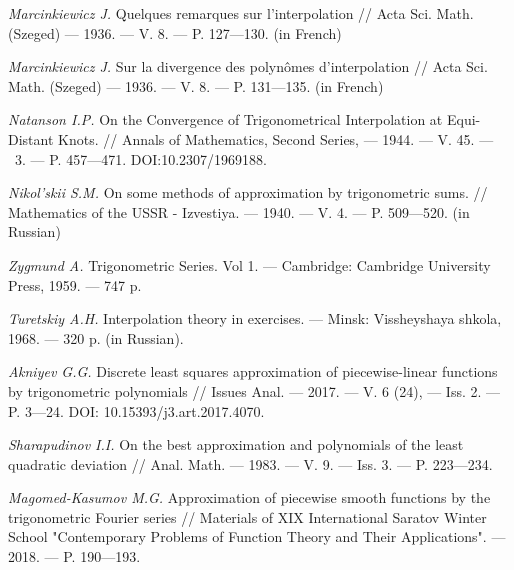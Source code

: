 \begin{thebibliography}{111}
\textit{Marcinkiewicz J.} Quelques remarques sur l'interpolation // Acta Sci. Math. (Szeged) --- 1936. --- V. 8. --- P. 127---130. (in French)



\textit{Marcinkiewicz J.} Sur la divergence des polyn{\^o}mes d'interpolation // Acta Sci. Math. (Szeged) --- 1936. --- V. 8. --- P. 131---135. (in French)



\textit{Natanson I.P.} On the Convergence of Trigonometrical Interpolation at Equi-Distant Knots. // Annals of Mathematics, Second Series, --- 1944. --- V. 45. --- \No\ 3. --- P. 457---471. DOI:10.2307/1969188.



\textit{Nikol'skii S.M.} On some methods of approximation by trigonometric sums. // Mathematics of the USSR - Izvestiya. --- 1940. --- V. 4. --- P. 509---520. (in Russian)



\textit{Zygmund A.} Trigonometric Series. Vol 1. --- Cambridge:
Cambridge University Press, 1959. --- 747 p.	



\textit{Turetskiy A.H.} Interpolation theory in exercises. --- Minsk: Vissheyshaya shkola, 1968. --- 320 p. (in Russian).



\textit{Akniyev G.G.} Discrete least squares approximation of piecewise-linear functions by trigonometric polynomials // Issues Anal. --- 2017. --- V. 6 (24), --- Iss. 2. --- P. 3---24. DOI: 10.15393/j3.art.2017.4070.



\textit{Sharapudinov I.I.} On the best approximation and polynomials of the least quadratic deviation // Anal. Math. --- 1983. --- V. 9. --- Iss. 3. --- P. 223---234.



\textit{Magomed-Kasumov M.G.}
Approximation of piecewise smooth functions by the trigonometric Fourier series //
Materials of XIX International Saratov Winter School "Contemporary Problems of Function Theory and Their Applications". --- 2018. --- P. 190---193.




\end{thebibliography}
